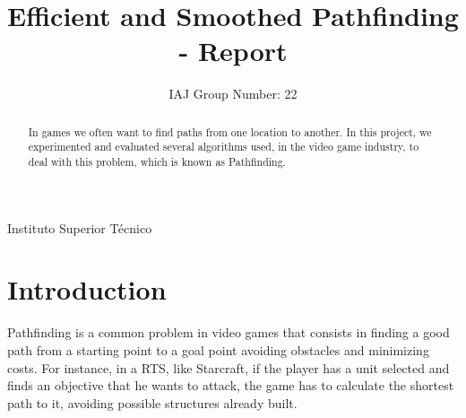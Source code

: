 \documentclass{sigplanconf}[10pt]
\begin{document}
\setlength{\pdfpageheight}{\paperheight}
\setlength{\pdfpagewidth}{\paperwidth}





\title{Efficient and Smoothed Pathfinding - Report}
\subtitle{IAJ Group Number: 22}

           {Instituto Superior Técnico}


\maketitle

\begin{abstract}
In games we often want to find paths from one location to another. In this project, we experimented and evaluated several algorithms used, in the video game industry, to deal with this problem, which is known as Pathfinding.
\end{abstract}



\section{Introduction}

Pathfinding is a common problem in video games that consists in finding a good path from a starting point to a goal point avoiding obstacles and minimizing costs. For instance, in a RTS, like Starcraft, if the player has a unit selected and finds an objective that he wants to attack, the game has to calculate the shortest path to it, avoiding possible structures already built.
\end{document}
